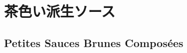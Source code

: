 \documentclass[twoside,12Q,b5j]{escoffierltjsbook}
\date{}
\renewcommand{\thechapter}{}
\renewcommand{\thesection}{}
\begin{document}







\section{茶色い派生ソース}\label{ux8336ux8272ux3044ux6d3eux751fux30bdux30fcux30b9}

\subsection{Petites Sauces Brunes
Composées}\label{petites-sauces-brunes-composees}
\end{document}
